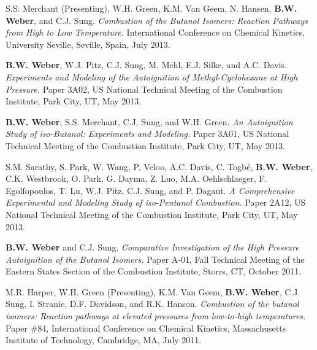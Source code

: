 \begin{bibsection}
\item[] S.S. Merchant (Presenting), W.H. Green, K.M. Van Geem, N.
        Hansen, \textbf{B.W. Weber}, and C.J. Sung.
        \textit{Combustion of the Butanol Isomers: Reaction Pathways
        from High to Low Temperature.}  International
        Conference on Chemical Kinetics, University Seville, Seville,
        Spain, July 2013.

\item[] \textbf{B.W. Weber}, W.J. Pitz, C.J. Sung, M. Mehl,
        E.J. Silke, and A.C. Davis. \textit{Experiments and Modeling of
        the Autoignition of Methyl-Cyclohexane at High Pressure.}
        Paper 3A02,  US National Technical Meeting of the
        Combustion Institute, Park City, UT, May 2013.

\item[] \textbf{B.W. Weber}, S.S. Merchant, C.J. Sung, and W.H. Green.
        \textit{An Autoignition Study of iso-Butanol: Experiments and
        Modeling.} Paper 3A01,  US National Technical
        Meeting of the Combustion Institute, Park City, UT, May 2013.

\item[] S.M. Sarathy, S. Park, W. Wang, P. Veloo, A.C. Davis,
        C. Togbé, \textbf{B.W. Weber}, C.K. Westbrook, O. Park,
        G. Dayma, Z. Luo, M.A. Oehlschlaeger, F. Egolfopoulos, T. Lu,
        W.J. Pitz, C.J. Sung, and P. Dagaut. \textit{A Comprehensive
        Experimental and Modeling Study of iso-Pentanol Combustion.}
        Paper 2A12,  US National Technical Meeting of the
        Combustion Institute, Park City, UT, May 2013.

\item[] \textbf{B.W. Weber} and C.J. Sung. \textit{Comparative
        Investigation of the High Pressure Autoignition of the Butanol
        Isomers.} Paper A-01, Fall Technical Meeting of the Eastern
        States Section of the Combustion Institute, Storrs, CT, October
        2011.

\item[] M.R. Harper, W.H. Green (Presenting), K.M. Van Geem,
        \textbf{B.W. Weber}, C.J. Sung, I. Stranic, D.F. Davidson,
        and R.K. Hanson. \textit{Combustion of the butanol isomers:
        Reaction pathways at elevated pressures from low-to-high
        temperatures.} Paper \#84,  International
        Conference on Chemical Kinetics, Massachusetts Institute of
        Technology, Cambridge, MA, July 2011.


\end{bibsection}
